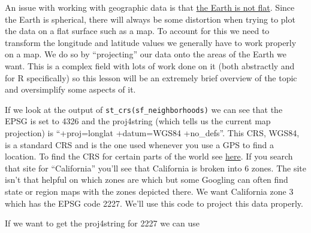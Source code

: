 \documentclass[
  12pt,
  openany]{book}
\begin{document}
An issue with working with geographic data is that \href{https://en.wikipedia.org/wiki/Spherical_Earth}{the Earth is not flat}. Since the Earth is spherical, there will always be some distortion when trying to plot the data on a flat surface such as a map. To account for this we need to transform the longitude and latitude values we generally have to work properly on a map. We do so by ``projecting'' our data onto the areas of the Earth we want. This is a complex field with lots of work done on it (both abstractly and for R specifically) so this lesson will be an extremely brief overview of the topic and oversimplify some aspects of it.

If we look at the output of \texttt{st\_crs(sf\_neighborhoods)} we can see that the EPSG is set to 4326 and the proj4string (which tells us the current map projection) is ``+proj=longlat +datum=WGS84 +no\_defs''. This CRS, WGS84, is a standard CRS and is the one used whenever you use a GPS to find a location. To find the CRS for certain parts of the world see \href{https://spatialreference.org/}{here}. If you search that site for ``California'' you'll see that California is broken into 6 zones. The site isn't that helpful on which zones are which but some Googling can often find state or region maps with the zones depicted there. We want California zone 3 which has the EPSG code 2227. We'll use this code to project this data properly.

If we want to get the proj4string for 2227 we can use
\end{document}
